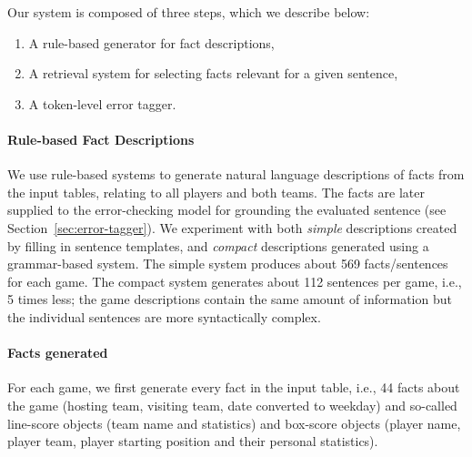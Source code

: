 Our system is composed of three steps, which we describe below:
\begin{enumerate}
    \item A rule-based generator for fact descriptions,
    \item A retrieval system for selecting facts relevant for a given sentence,
    \item A token-level error tagger.
\end{enumerate}


\paragraph{Rule-based Fact Descriptions}

We use rule-based systems to generate natural language descriptions of facts from the input tables, relating to all players and both teams. The facts are later supplied to the error-checking model for grounding the evaluated sentence (see Section~\ref{sec:error-tagger}).
We experiment with both \emph{simple} descriptions created by filling in sentence templates, and \emph{compact} descriptions generated using a grammar-based system.
The simple system produces about 569 facts/sentences for each game.
The compact system generates about 112 sentences per game, i.e., 5 times less; the game descriptions contain the same amount of information but the individual sentences are more syntactically complex.

\paragraph{Facts generated} For each game, we first generate every fact in the input table, i.e., 44 facts about the game (hosting team, visiting team, date converted to weekday) and so-called line-score objects (team name and statistics) and box-score objects (player name, player team, player starting position and their personal statistics).


